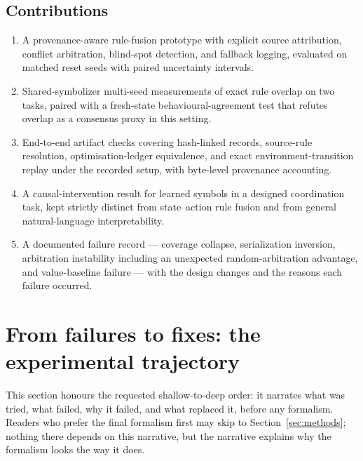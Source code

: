 \documentclass[11pt,a4paper]{article}
\theoremstyle{definition}
\begin{document}
\subsection{Contributions}

\begin{enumerate}[leftmargin=2em]
\item A provenance-aware rule-fusion prototype with explicit source
attribution, conflict arbitration, blind-spot detection, and fallback
logging, evaluated on matched reset seeds with paired uncertainty intervals.
\item Shared-symbolizer multi-seed measurements of exact rule overlap on two
tasks, paired with a fresh-state behavioural-agreement test that refutes
overlap as a consensus proxy in this setting.
\item End-to-end artifact checks covering hash-linked records, source-rule
resolution, optimisation-ledger equivalence, and exact environment-transition
replay under the recorded setup, with byte-level provenance accounting.
\item A causal-intervention result for learned symbols in a designed
coordination task, kept strictly distinct from state--action rule fusion and
from general natural-language interpretability.
\item A documented failure record --- coverage collapse, serialization
inversion, arbitration instability including an unexpected random-arbitration
advantage, and value-baseline failure --- with the design changes and the
reasons each failure occurred.
\end{enumerate}

\section{From failures to fixes: the experimental trajectory}
\label{sec:failures}

This section honours the requested shallow-to-deep order: it narrates what
was tried, what failed, why it failed, and what replaced it, before any
formalism. Readers who prefer the final formalism first may skip to
Section~\ref{sec:methods}; nothing there depends on this narrative, but the
narrative explains why the formalism looks the way it does.
\end{document}
